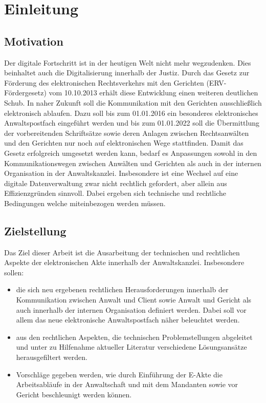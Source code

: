 \section{Einleitung}

\subsection*{Motivation}
Der digitale Fortschritt ist in der heutigen Welt nicht mehr wegzudenken. Dies beinhaltet auch die Digitalisierung innerhalb der Justiz. Durch das Gesetz zur Förderung des elektronischen Rechtsverkehrs mit den Gerichten (ERV-Fördergesetz) vom 10.10.2013 erhält diese Entwicklung einen weiteren deutlichen Schub. In naher Zukunft soll die Kommunikation mit den Gerichten ausschließlich elektronisch ablaufen. Dazu soll bis zum 01.01.2016 ein besonderes elektronisches Anwaltspostfach eingeführt werden und bis zum 01.01.2022 soll die Übermittlung der vorbereitenden Schriftsätze sowie deren Anlagen zwischen Rechtsanwälten und den Gerichten nur noch auf elektronischen Wege stattfinden. 
Damit das Gesetz erfolgreich umgesetzt werden kann, bedarf es Anpassungen sowohl in den Kommunikationswegen zwischen Anwälten und Gerichten als auch in der internen Organisation in der Anwaltskanzlei. Insbesondere ist eine Wechsel auf eine digitale Datenverwaltung zwar nicht rechtlich gefordert, aber allein aus Effizienzgründen sinnvoll. Dabei ergeben sich technische und rechtliche Bedingungen welche miteinbezogen werden müssen.  

\subsection*{Zielstellung}
Das Ziel dieser Arbeit ist die Ausarbeitung der technischen und rechtlichen Aspekte der elektronischen Akte innerhalb der Anwaltskanzlei. Insbesondere sollen:
\begin{itemize}
\item die sich neu ergebenen rechtlichen Herausforderungen innerhalb der Kommunikation zwischen Anwalt und Client sowie Anwalt und Gericht als auch innerhalb der internen Organisation definiert werden.  Dabei soll vor allem das neue elektronische Anwaltspostfach näher beleuchtet werden.
\item aus den rechtlichen Aspekten, die technischen Problemstellungen abgeleitet und unter zu Hilfenahme aktueller Literatur verschiedene Lösungsansätze herausgefiltert werden.
\item  Vorschläge gegeben werden, wie durch Einführung der E-Akte die Arbeitsabläufe in der Anwaltschaft und mit dem Mandanten sowie vor Gericht beschleunigt werden können.
\end{itemize} 
